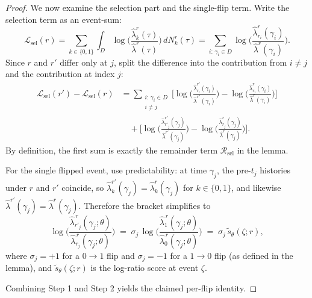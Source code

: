 \documentclass{statsoc}
\newcommand{\1}{\mathbbm{1}}
\begin{document}
\begin{proof}
\medskip
We now examine the selection part and the single-flip term. Write the selection term as an event-sum:
\[
\mathcal L_{\mathrm{sel}}(r)
 =
 \sum_{k\in\{0,1\}}\int_D \log\!\Big(\frac{\widehat\lambda_k^{r}(\tau)}{\widehat\lambda^{r}(\tau)}\Big)\,dN_k^r(\tau)
 =
 \sum_{i:\,\gamma_i\in D} \log\!\Big(\frac{\widehat\lambda_{r_i}^{r}(\gamma_i)}{\widehat\lambda^{r}(\gamma_i)}\Big).
\]
Since $r$ and $r'$ differ only at $j$, split the difference into the contribution from $i\neq j$ and the contribution at index $j$:
\begin{align*}
\mathcal L_{\mathrm{sel}}(r')-\mathcal L_{\mathrm{sel}}(r)
&=
\sum_{\substack{i:\,\gamma_i\in D\\ i\neq j}}
\Bigg[
\log\!\Big(\frac{\widehat\lambda_{r_i}^{r'}(\gamma_i)}{\widehat\lambda^{r'}(\gamma_i)}\Big)
-
\log\!\Big(\frac{\widehat\lambda_{r_i}^{r}(\gamma_i)}{\widehat\lambda^{r}(\gamma_i)}\Big)
\Bigg]\\
&\quad+
\Bigg[
\log\!\Big(\frac{\widehat\lambda_{r'_{j}}^{r'}(\gamma_{j})}{\widehat\lambda^{r'}(\gamma_{j})}\Big)
-
\log\!\Big(\frac{\widehat\lambda_{r_{j}}^{r}(\gamma_{j})}{\widehat\lambda^{r}(\gamma_{j})}\Big)
\Bigg].
\end{align*}
By definition, the first sum is exactly the remainder term $\mathcal R_{\mathrm{sel}}$ in the lemma.

For the single flipped event, use predictability: at time $\gamma_{j}$, the pre-$t_j$ histories under $r$ and $r'$ coincide, so $\widehat\lambda_k^{r'}(\gamma_{j})=\widehat\lambda_k^{r}(\gamma_{j})$ for $k\in\{0,1\}$, and likewise $\widehat\lambda^{r'}(\gamma_{j})=\widehat\lambda^{r}(\gamma_{j})$. Therefore the bracket simplifies to
\[
\log\!\Big(\frac{\widehat\lambda_{r'_j}^{\,r}(\gamma_j;\theta)}{\widehat\lambda_{r_j}^{\,r}(\gamma_j;\theta)}\Big)
\;=\;
\sigma_j\,\log\!\Big(\frac{\widehat\lambda_1^{\,r}(\gamma_j;\theta)}{\widehat\lambda_0^{\,r}(\gamma_j;\theta)}\Big)
\;=\;
\sigma_j\,\tilde s_\theta(\zeta;r),
\]
where $\sigma_j=+1$ for a $0\to1$ flip and $\sigma_j=-1$ for a $1\to0$ flip (as defined in the lemma), and $\tilde s_\theta(\zeta;r)$ is the log-ratio score at event $\zeta$.

Combining Step 1 and Step 2 yields the claimed per-flip identity.
\end{proof}
\end{document}
